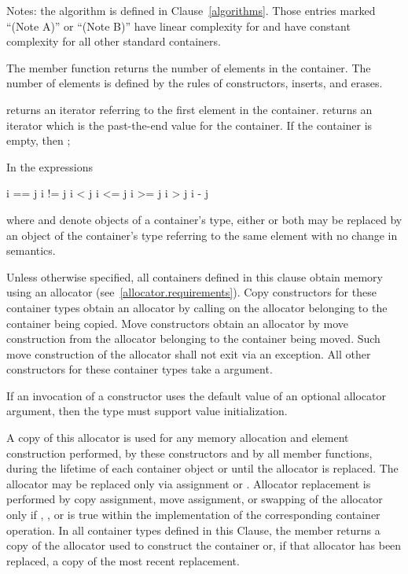 Notes: the algorithm
is defined in Clause~\ref{algorithms}.
Those entries marked ``(Note A)'' or ``(Note B)''
have linear complexity for  and have constant complexity
for all other standard containers.

\pnum
The member function  returns the number of elements in the container.
The number of elements is defined by the rules of
constructors, inserts, and erases.

\pnum
{}
returns an iterator referring to the first element in the container.
returns an iterator which is the past-the-end value for the container.
If the container is empty, then
;

\pnum
In the expressions
\begin{codeblock}
i == j
i != j
i < j
i <= j
i >= j
i > j
i - j
\end{codeblock}
where  and  denote objects of a container's 
type, either or both may be replaced by an object of the container's
 type referring to the same element with no change in semantics.

\pnum
Unless otherwise specified, all containers defined in this clause obtain memory
using an allocator (see~\ref{allocator.requirements}).
Copy constructors for these container types obtain an allocator by calling
on the allocator belonging to the container being copied.
Move constructors obtain an allocator by move construction from the allocator belonging to
the container being moved. Such move construction of the allocator shall not exit via an
exception.
All other constructors for these container types take a
 argument.
\begin{note} If an invocation of a constructor uses the default value of an optional
allocator argument, then the  type must support value initialization.
\end{note}
A copy of this allocator is used for any memory allocation and element construction
performed, by these constructors and by all member functions,
during the lifetime of each container object
or until the allocator is replaced. The allocator may be replaced only via assignment or
. Allocator replacement is performed by
copy assignment, move assignment, or swapping of the allocator only if
,
,
or  is true
within the implementation of the corresponding container operation.
In all container types defined in this Clause, the member 
returns a copy of the allocator used to construct the container or, if that allocator
has been replaced, a copy of the most recent replacement.

